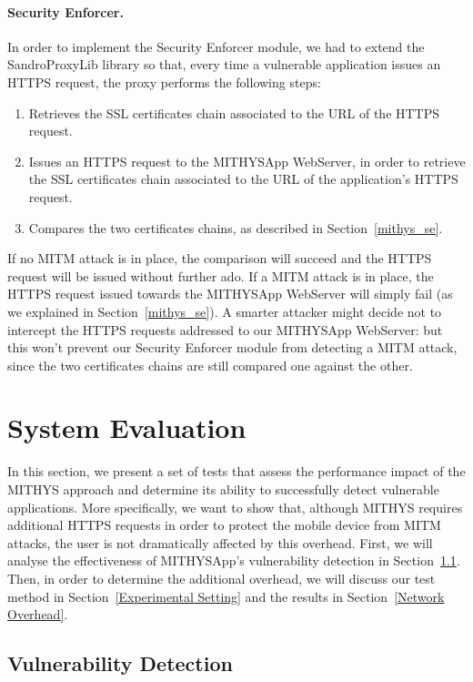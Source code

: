 \documentclass[english]{llncs}
\begin{document}
\paragraph{Security Enforcer.} In order to implement the Security Enforcer module, we had to extend the SandroProxyLib library so that, every time a vulnerable application issues an HTTPS request, the proxy performs the following steps:

\begin{enumerate}
	\item Retrieves the SSL certificates chain associated to the URL of the HTTPS request.
	\item Issues an HTTPS request to the MITHYSApp WebServer, in order to retrieve the SSL certificates chain associated to the URL of the application's HTTPS request.
	\item Compares the two certificates chains, as described in Section~\ref{mithys_se}.
\end{enumerate}

If no MITM attack is in place, the comparison will succeed and the HTTPS request will be issued without further ado. If a MITM attack is in place, the HTTPS request issued towards the MITHYSApp WebServer will simply fail (as we explained in Section~\ref{mithys_se}). A smarter attacker might decide not to intercept the HTTPS requests addressed to our MITHYSApp WebServer: but this won't prevent our Security Enforcer module from detecting a MITM attack, since the two certificates chains are still compared one against the other.

\section{System Evaluation}
\label{System Evaluation}

In this section, we present a set of tests that assess the performance impact of the MITHYS approach and determine its ability to successfully detect vulnerable applications. More specifically, we want to show that, although MITHYS requires additional HTTPS requests in order to protect the mobile device from MITM attacks, the user is not dramatically affected by this overhead. First, we will analyse the effectiveness of MITHYSApp's vulnerability detection in Section~\ref{Vulnerability Detection}. Then, in order to determine the additional overhead, we will discuss our test method in Section~\ref{Experimental Setting} and the results in Section~\ref{Network Overhead}.

\subsection{Vulnerability Detection}
\label{Vulnerability Detection}
\end{document}
